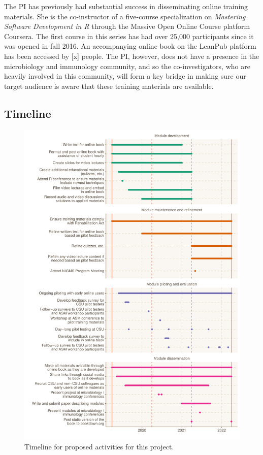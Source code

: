 \documentclass[pdftex,english,11pt,parskip=half]{scrartcl}
\begin{document}
The PI has previously had substantial success in disseminating online training materials. She is the co-instructor of a five-course specialization on \textit{Mastering Software Development in R} through the Massive Open Online Course platform Coursera. The first course in this series has had over 25,000 participants since it was opened in fall 2016. An accompanying online book on the LeanPub platform has been accessed by [x] people. The PI, however, does not have a presence in the microbiology and immunology community, and so the co-investigators, who are heavily involved in this community, will form a key bridge in making sure our target audience is aware that these training materials are available.

\subsection{Timeline}

\begin{figure}[ht]
    \includegraphics[width=\textwidth]{figures/timeline.pdf}
    \caption{Timeline for proposed activities for this project.}
    \label{fig:timeline}
\end{figure}

\clearpage



\end{document}
